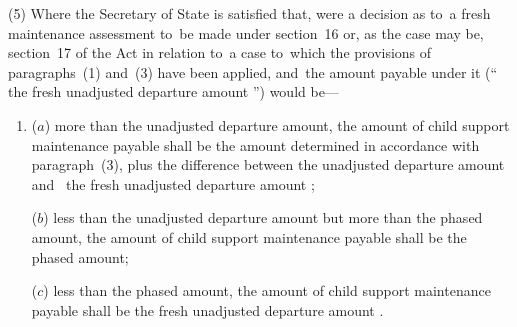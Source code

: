 \documentclass[12pt,a4paper]{article}
\begin{document}
(5) 
Where the Secretary of State is satisfied that, were a decision as to~a fresh maintenance assessment to~be made under section~16 or, as the case may be, section~17 of the Act  %
in relation to~a case to~which the provisions of 
paragraphs~(1) and~(3)  %
have been applied, and~the amount payable under it (“%
the fresh unadjusted departure amount%
”) would be—
\begin{enumerate}\item[]
($a$) more than the unadjusted departure amount, the amount of child support maintenance payable shall be the amount determined in accordance with paragraph~(3), plus the difference between the unadjusted departure amount and~
the fresh unadjusted departure amount%
;

($b$) less than the unadjusted departure amount but more than the phased amount,
the amount of child support maintenance payable shall be the phased amount;

($c$) less than the phased amount, the amount of child support maintenance payable
shall be 
the fresh unadjusted departure amount%
.
\end{enumerate}
\end{document}
